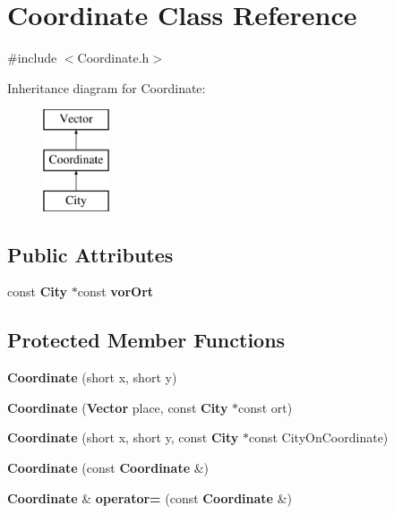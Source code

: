 \section{Coordinate Class Reference}
\label{class_coordinate}


{\ttfamily \#include $<$Coordinate.\-h$>$}

Inheritance diagram for Coordinate\-:\begin{figure}[H]
\begin{center}
\leavevmode
\includegraphics[height=3.000000cm]{class_coordinate}
\end{center}
\end{figure}
\subsection*{Public Attributes}
\begin{DoxyCompactItemize}
\item 
const {\bf City} $\ast$const {\bf vor\-Ort}
\end{DoxyCompactItemize}
\subsection*{Protected Member Functions}
\begin{DoxyCompactItemize}
\item 
{\bf Coordinate} (short x, short y)
\item 
{\bfseries Coordinate} ({\bf Vector} place, const {\bf City} $\ast$const ort)\label{class_coordinate_aa299c35ffbf14f830e03f295bb00ffbe}

\item 
{\bf Coordinate} (short x, short y, const {\bf City} $\ast$const City\-On\-Coordinate)
\item 
{\bfseries Coordinate} (const {\bf Coordinate} \&)\label{class_coordinate_a248289957684dfd5be0caf74afdef444}

\item 
{\bf Coordinate} \& {\bfseries operator=} (const {\bf Coordinate} \&)\label{class_coordinate_aa10406cfde8b6bcfe07244304fe7a06a}

\end{DoxyCompactItemize}
